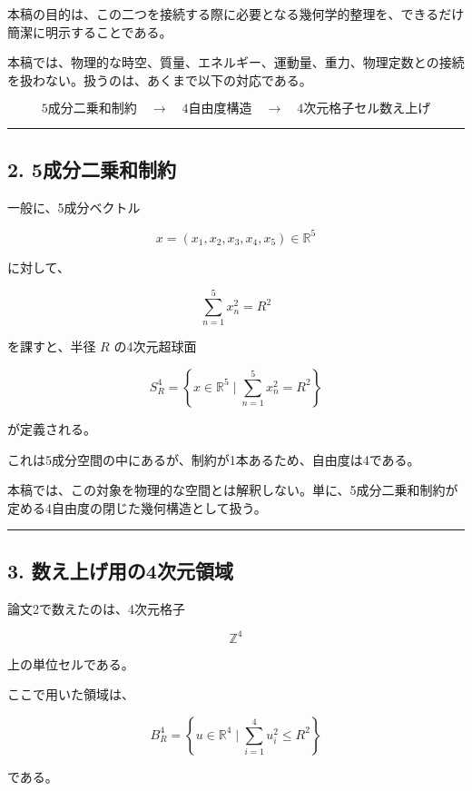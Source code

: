 \documentclass[
]{ltjsarticle}
\begin{document}
本稿の目的は、この二つを接続する際に必要となる幾何学的整理を、できるだけ簡潔に明示することである。

本稿では、物理的な時空、質量、エネルギー、運動量、重力、物理定数との接続を扱わない。扱うのは、あくまで以下の対応である。

\[
\text{5成分二乗和制約}
\quad\longrightarrow\quad
\text{4自由度構造}
\quad\longrightarrow\quad
\text{4次元格子セル数え上げ}
\]

\begin{center}\rule{0.5\linewidth}{0.5pt}\end{center}

\subsection{2.
5成分二乗和制約}\label{ux6210ux5206ux4e8cux4e57ux548cux5236ux7d04}

一般に、5成分ベクトル

\[
x=(x_1,x_2,x_3,x_4,x_5)\in\mathbb{R}^5
\]

に対して、

\[
\sum_{n=1}^{5}x_n^2=R^2
\]

を課すと、半径 \(R\) の4次元超球面

\[
S^4_R
=
\left\{
x\in\mathbb{R}^5
\mid
\sum_{n=1}^{5}x_n^2=R^2
\right\}
\]

が定義される。

これは5成分空間の中にあるが、制約が1本あるため、自由度は4である。

本稿では、この対象を物理的な空間とは解釈しない。単に、5成分二乗和制約が定める4自由度の閉じた幾何構造として扱う。

\begin{center}\rule{0.5\linewidth}{0.5pt}\end{center}

\subsection{3.
数え上げ用の4次元領域}\label{ux6570ux3048ux4e0aux3052ux7528ux306e4ux6b21ux5143ux9818ux57df}

論文2で数えたのは、4次元格子

\[
\mathbb{Z}^4
\]

上の単位セルである。

ここで用いた領域は、

\[
B^4_R
=
\left\{
u\in\mathbb{R}^4
\mid
\sum_{i=1}^{4}u_i^2\le R^2
\right\}
\]

である。
\end{document}
